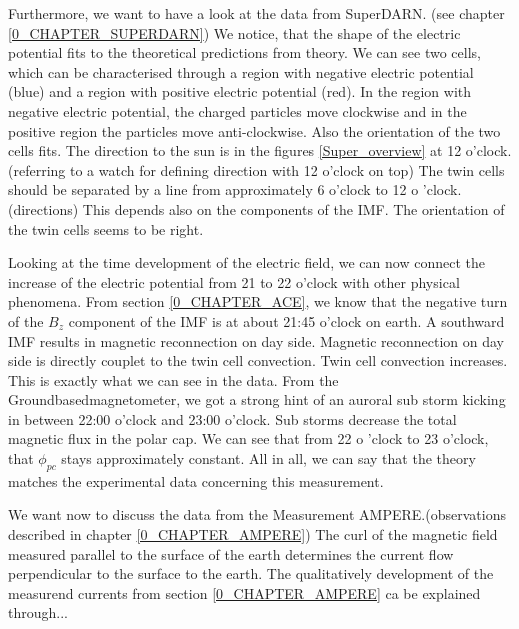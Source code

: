 \documentclass[10pt,a4paper]{article}
\begin{document}
Furthermore, we want to have a look at the data from SuperDARN. (see chapter \ref{0_CHAPTER_SUPERDARN})
We notice, that the shape of the electric potential fits to the theoretical predictions from theory. We can see two cells, which can be characterised through a region with negative electric potential (blue) and a region with positive electric potential (red). In the region with negative electric potential, the charged particles move clockwise and in the positive region the particles move anti-clockwise. 
Also the orientation of the two cells fits. The direction to the sun is in the figures \ref{Super_overview} at 12 o'clock. (referring to a watch for defining direction with 12 o'clock on top) The twin cells should be separated by a line from approximately 6 o'clock to 12 o 'clock.(directions) This depends also on the components of the IMF. The orientation of the twin cells seems to be right.  

Looking at the time development of the electric field, we can now connect the increase of the electric potential from 21 to 22 o'clock with other physical phenomena. From section \ref{0_CHAPTER_ACE}, we know that the negative turn of the $B_z$ component of the IMF is at about 21:45 o'clock on earth. A southward IMF results in magnetic reconnection on day side. Magnetic reconnection on day side is directly couplet to the twin cell convection. Twin cell convection increases. This is exactly what we can see in the data. From the Groundbasedmagnetometer, we got a strong  hint of an auroral sub storm kicking in between 22:00 o'clock and 23:00 o'clock. Sub storms decrease the total magnetic flux in the polar cap. We can see that from 22 o 'clock to 23 o'clock, that $\phi_{pc}$ stays approximately constant. 
All in all, we can say that the theory matches the experimental data concerning this measurement. 

We want now to discuss the data from the Measurement AMPERE.(observations described in chapter \ref{0_CHAPTER_AMPERE}) The  curl of the magnetic field measured parallel to the surface of the earth determines the current flow perpendicular to the surface to the earth. 
The qualitatively development of the measurend currents from section \ref{0_CHAPTER_AMPERE} ca be explained through...
\end{document}
